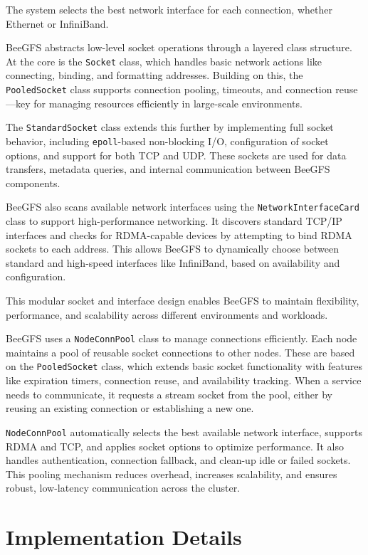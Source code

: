 The system selects the best network interface for each connection, whether Ethernet or InfiniBand.

BeeGFS abstracts low-level socket operations through a layered class structure. At the core is the \texttt{Socket} class, which handles basic network actions like connecting, binding, and formatting addresses. Building on this, the \texttt{PooledSocket} class supports connection pooling, timeouts, and connection reuse—key for managing resources efficiently in large-scale environments.

The \texttt{StandardSocket} class extends this further by implementing full socket behavior, including \texttt{epoll}-based non-blocking I/O, configuration of socket options, and support for both TCP and UDP. These sockets are used for data transfers, metadata queries, and internal communication between BeeGFS components.

BeeGFS also scans available network interfaces using the \texttt{NetworkInterfaceCard} class to support high-performance networking. It discovers standard TCP/IP interfaces and checks for RDMA-capable devices by attempting to bind RDMA sockets to each address. This allows BeeGFS to dynamically choose between standard and high-speed interfaces like InfiniBand, based on availability and configuration.

This modular socket and interface design enables BeeGFS to maintain flexibility, performance, and scalability across different environments and workloads.

BeeGFS uses a \texttt{NodeConnPool} class to manage connections efficiently. Each node maintains a pool of reusable socket connections to other nodes. These are based on the \texttt{PooledSocket} class, which extends basic socket functionality with features like expiration timers, connection reuse, and availability tracking. When a service needs to communicate, it requests a stream socket from the pool, either by reusing an existing connection or establishing a new one.

\texttt{NodeConnPool} automatically selects the best available network interface, supports RDMA and TCP, and applies socket options to optimize performance. It also handles authentication, connection fallback, and clean-up idle or failed sockets. This pooling mechanism reduces overhead, increases scalability, and ensures robust, low-latency communication across the cluster.

\section{Implementation Details}

